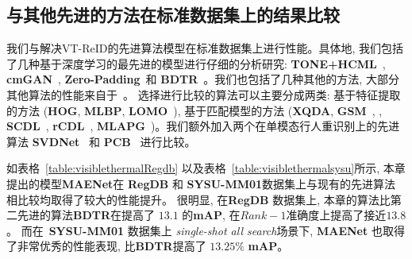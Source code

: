 \subsection{与其他先进的方法在标准数据集上的结果比较}
我们与解决VT-ReID的先进算法模型在标准数据集上进行性能。具体地, 我们包括了几种基于深度学习的最先进的模型进行仔细的分析研究: \textbf{TONE+HCML}~\cite{ye2018hierarchical}, \textbf{cmGAN}~\cite{dai2018cross}, \textbf{Zero-Padding}~\cite{wu2017rgb}和 \textbf{BDTR}~\cite{ye2019bi}。我们也包括了几种其他的方法, 大部分其他算法的性能来自于~\cite{ye2019bi}。 选择进行比较的算法可以主要分成两类: 基于特征提取的方法 (\textbf{HOG}, \textbf{MLBP}, \textbf{LOMO}~\cite{liao2015person}), 基于匹配模型的方法 (\textbf{XQDA}, \textbf{GSM}~\cite{lin2016cross}, , \textbf{SCDL}~\cite{wang2012semi}, \textbf{rCDL}~\cite{huang2013coupled}, \textbf{MLAPG}~\cite{liao2015efficient})。我们额外加入两个在单模态行人重识别上的先进算法 \textbf{SVDNet}~\cite{sun2017svdnet} 和 \textbf{PCB}~\cite{sun2018beyond} 进行比较。\par
如表格~\ref{table:visiblethermalRegdb} 以及表格~\ref{table:visiblethermalsysu}所示, 本章提出的模型\textbf{MAENet}在 \textbf{RegDB} 和 \textbf{SYSU-MM01}数据集上与现有的先进算法相比较均取得了较大的性能提升。 很明显, 在\textbf{RegDB} 数据集上, 本章的算法比第二先进的算法\textbf{BDTR}在提高了 $13.1$
的\textbf{mAP}, 在$Rank-1$准确度上提高了接近$13.8$。 而在~\textbf{SYSU-MM01} 数据集上 \textit{single-shot all search}场景下, \textbf{MAENet} 也取得了非常优秀的性能表现, 比\textbf{BDTR}提高了 $13.25 \%$ \textbf{mAP}。

